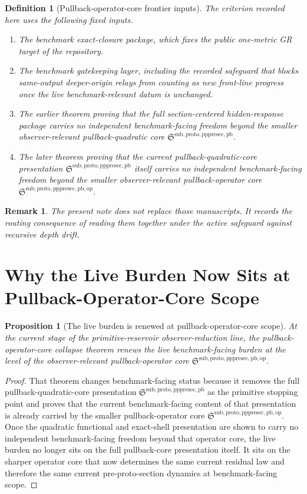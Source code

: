 \documentclass[11pt]{article}
\newcommand{\PrePreProtoSectionPullbackCore}{\mathfrak S^{\mathrm{sub,proto,pppresec,pb}}}
\newcommand{\PullbackOperatorCore}{\mathfrak S^{\mathrm{sub,proto,pppresec,pb,op}}}
\newtheorem{definition}{Definition}
\newtheorem{proposition}{Proposition}
\newtheorem{remark}{Remark}
\begin{document}
\begin{definition}[Pullback-operator-core frontier inputs]
The criterion recorded here uses the following fixed inputs.
\begin{enumerate}
    \item The benchmark exact-closure package, which fixes the public one-metric GR target of the repository.
    \item The benchmark gatekeeping layer, including the recorded safeguard that blocks same-output deeper-origin relays from counting as new front-line progress once the live benchmark-relevant datum is unchanged.
    \item The earlier theorem proving that the full section-centered hidden-response package carries no independent benchmark-facing freedom beyond the smaller observer-relevant pullback-quadratic core \(\PrePreProtoSectionPullbackCore\).
    \item The later theorem proving that the current pullback-quadratic-core presentation \(\PrePreProtoSectionPullbackCore\) itself carries no independent benchmark-facing freedom beyond the smaller observer-relevant pullback-operator core \(\PullbackOperatorCore\).
\end{enumerate}
\end{definition}

\begin{remark}
The present note does not replace those manuscripts. It records the routing consequence of reading them together under the active safeguard against recursive depth drift.
\end{remark}

\section{Why the Live Burden Now Sits at Pullback-Operator-Core Scope}

\begin{proposition}[The live burden is renewed at pullback-operator-core scope]
At the current stage of the primitive-reservoir observer-reduction line, the pullback-operator-core collapse theorem renews the live benchmark-facing burden at the level of the observer-relevant pullback-operator core \(\PullbackOperatorCore\).
\end{proposition}

\begin{proof}
That theorem changes benchmark-facing status because it removes the full pullback-quadratic-core presentation \(\PrePreProtoSectionPullbackCore\) as the primitive stopping point and proves that the current benchmark-facing content of that presentation is already carried by the smaller pullback-operator core \(\PullbackOperatorCore\). Once the quadratic functional and exact-shell presentation are shown to carry no independent benchmark-facing freedom beyond that operator core, the live burden no longer sits on the full pullback-core presentation itself. It sits on the sharper operator core that now determines the same current residual law and therefore the same current pre-proto-section dynamics at benchmark-facing scope.
\end{proof}
\end{document}
